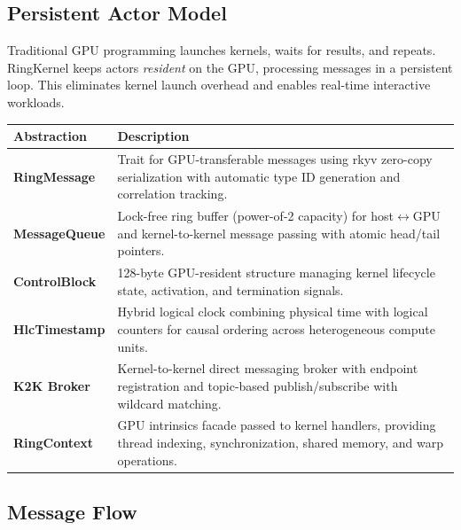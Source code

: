 \documentclass[11pt,a4paper]{article}
\begin{document}
\subsection{Persistent Actor Model}

Traditional GPU programming launches kernels, waits for results, and repeats.
RingKernel keeps actors \emph{resident} on the GPU, processing messages in a
persistent loop. This eliminates kernel launch overhead and enables real-time
interactive workloads.

\begin{table}[h!]
\centering
\renewcommand{\arraystretch}{1.25}
\begin{tabularx}{\textwidth}{>{\bfseries\color{brand}}l X}
\toprule
\textbf{Abstraction} & \textbf{Description} \\
\midrule
RingMessage &
  Trait for GPU-transferable messages using rkyv zero-copy serialization with
  automatic type ID generation and correlation tracking. \\
MessageQueue &
  Lock-free ring buffer (power-of-2 capacity) for host$\leftrightarrow$GPU and
  kernel-to-kernel message passing with atomic head/tail pointers. \\
ControlBlock &
  128-byte GPU-resident structure managing kernel lifecycle state, activation,
  and termination signals. \\
HlcTimestamp &
  Hybrid logical clock combining physical time with logical counters for
  causal ordering across heterogeneous compute units. \\
K2K Broker &
  Kernel-to-kernel direct messaging broker with endpoint registration and
  topic-based publish/subscribe with wildcard matching. \\
RingContext &
  GPU intrinsics facade passed to kernel handlers, providing thread indexing,
  synchronization, shared memory, and warp operations. \\
\bottomrule
\end{tabularx}
\end{table}

\subsection{Message Flow}
\end{document}
